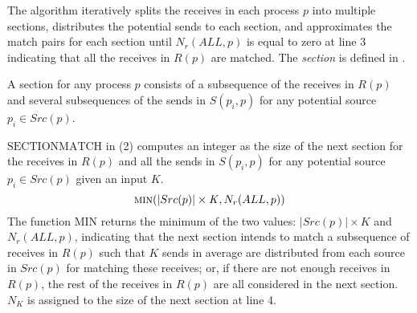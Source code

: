 The algorithm iteratively splits the receives in each process $p$ into multiple sections, distributes the potential sends to each section, and approximates the match pairs for each section until $N_r(ALL,p)$ is equal to zero at line 3 indicating that all the receives in $R(p)$ are matched.  The \emph{section} is defined in .

\begin{definition}
A section for any process $p$ consists of a subsequence of the receives in $R(p)$ and several subsequences of the sends in $S(p_i,p)$ for any potential source $p_i\in Src(p)$.
\label{def:section}
\end{definition}

$\mathrm{SECTIONMATCH}$ in (2) computes an integer as the size of the next section for the receives in $R(p)$ and all the sends in $S(p_{i},p)$ for any potential source $p_{i}\in Src(p)$ 
given an input $K$. 
\begin{equation}
\Call{min}{|Src(p)|\times\mathit{K}, N_r(ALL,p)}
\end{equation}
The function $\mathrm{MIN}$ returns the minimum of the two values: $|Src(p)|\times\mathit{K}$ and $ N_r(ALL,p)$, indicating that the next section intends to match a subsequence of receives in $R(p)$ such that $K$ sends in average are distributed from each source in $Src(p)$ for matching these receives; or, if there are not enough receives in $R(p)$, the rest of the receives in $R(p)$ are all considered in the next section. $N_K$ is assigned to the size of the next section at line 4. 

